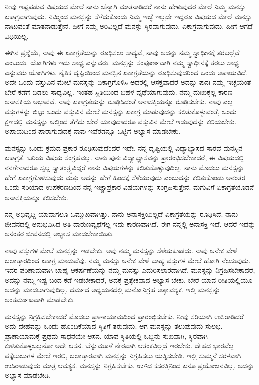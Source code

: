ನೀವು ಇಷ್ಟಪಡುವ ವಿಷಯದ ಮೇಲೆ ನಾನು ಚೆನ್ನಾಗಿ ಮಾತನಾಡಿದರೆ ನಾನು ಹೇಳುವುದರ ಮೇಲೆ ನಿಮ್ಮ ಮನಸ್ಸು ಏಕಾಗ್ರವಾಗುವುದು. ನಿಮ್ಮಿಂದ ಮನಸ್ಸನ್ನು ಸೆಳೆದುಕೊಂಡು ನಿಮ್ಮ ಇಚ್ಛೆ ಇಲ್ಲದೇ ಇದ್ದರೂ ವಿಷಯದ ಮೇಲೆ ಮನಸ್ಸು ನಾಟುವಂತೆ ಮಾತನಾಡುತ್ತೇನೆ. ಹೀಗೆ ನಮ್ಮ ಅರಿವಿಲ್ಲದೆ ಮನಸ್ಸು ಸ್ಥಿರವಾಗುವುದು, ಏಕಾಗ್ರವಾಗುವುದು. ಹೀಗೆ ಆಗದೆ ವಿಧಿಯಿಲ್ಲ.

ಈಗಿನ ಪ್ರಶ್ನೆಯೆ, ನಾವು ಈ ಏಕಾಗ್ರತೆಯನ್ನು ರೂಢಿಸಲು ಸಾಧ್ಯವೆ, ನಾವು ಅದನ್ನು ನಮ್ಮ ಸ್ವಾಧೀನಕ್ಕೆ ತರಬಲ್ಲೆವೆ ಎಂಬುದು. ಯೋಗಿಗಳು ಇದು ಸಾಧ್ಯ ಎನ್ನುವರು. ಮನಸ್ಸನ್ನು ಸಂಪೂರ್ಣವಾಗಿ ನಮ್ಮ ಸ್ವಾಧೀನಕ್ಕೆ ತರಲು ಸಾಧ್ಯ ಎನ್ನುವರು ಯೋಗಿಗಳು. ನೈತಿಕ ದೃಷ್ಟಿಯಿಂದ ಮನಸ್ಸಿನ ಏಕಾಗ್ರತೆಯನ್ನು ರೂಢಿಸುವುದರಿಂದ ಒಂದು ಅಪಾಯವಿದೆ. ಅದೇ ಒಂದು ವಸ್ತುವಿನ ಮೇಲೆ ಮನಸ್ಸನ್ನು ಏಕಾಗ್ರಗೊಳಿಸಿ ಅದರಲ್ಲಿ ಆಸಕ್ತವಾದರೆ ಅದನ್ನು ಪುನಃ ನಮ್ಮ ಇಚ್ಛೆಯಂತೆ ಬೇರೆ ಕಡೆಗೆ ಬಿಡಲು ಸಾಧ್ಯವಿಲ್ಲ. ಇಂತಹ ಸ್ಥಿತಿಯಿಂದ ಬಹಳ ವ್ಯಥೆಯಾಗುವುದು. ನಮ್ಮ ದುಃಖಕ್ಕೆಲ್ಲ ಕಾರಣ ಅನಾಸಕ್ತಿಯ ಅಭಾವವೆ. ನಾವು ಏಕಾಗ್ರತೆಯನ್ನು ರೂಢಿಸಿದಂತೆ ಅನಾಸಕ್ತಿಯನ್ನೂ ರೂಢಿಸಬೇಕು. ನಾವು ಎಲ್ಲ ವಸ್ತುಗಳನ್ನು ಬಿಟ್ಟು ಒಂದು ವಸ್ತುವಿನ ಮೇಲೆ ಮನಸ್ಸನ್ನು ಏಕಾಗ್ರ ಮಾಡುವುದನ್ನು ಕಲಿತುಕೊಳ್ಳುವಂತೆ, ಒಂದು ಕ್ಷಣದಲ್ಲಿ ಮನಸ್ಸನ್ನು ಅಲ್ಲಿಂದ ತೆಗೆದು ಬೇರೆ ಯಾವುದಾದರೂ ವಸ್ತುವಿನ ಮೇಲೆ ಇಡುವುದನ್ನು ಕಲಿಯಬೇಕು. ಅಪಾಯದಿಂದ ಪಾರಾಗುವುದಕ್ಕೆ ನಾವು ಇವೆರಡನ್ನೂ ಒಟ್ಟಿಗೆ ಅಭ್ಯಾಸ ಮಾಡಬೇಕು.

ಮನಸ್ಸನ್ನು ಒಂದು ಕ್ರಮದ ಪ್ರಕಾರ ರೂಢಿಸುವುದೆಂದರೆ ಇದೇ. ನನ್ನ ದೃಷ್ಟಿಯಲ್ಲಿ ವಿದ್ಯಾಭ್ಯಾಸದ ಸಾರವೆ ಮನಸ್ಸಿನ ಏಕಾಗ್ರತೆ. ಬರಿಯ ವಿಷಯ ಸಂಗ್ರಹವಲ್ಲ. ನಾನು ಪುನಃ ವಿದ್ಯಾಭ್ಯಾಸವನ್ನು ಪ್ರಾರಂಭಿಸಬೇಕಾದರೆ, ಈ ವಿಷಯದಲ್ಲಿ ನನಗೇನಾದರೂ ಸ್ವಲ್ಪ ಸ್ವಾತಂತ್ರ್ಯವಿದ್ದರೆ ನಾನು ವಿಷಯಗಳನ್ನು ಕಲಿತುಕೊಳ್ಳುವುದಿಲ್ಲ. ನಾನು ಮೊದಲು ಮನಸ್ಸನ್ನು ಹೇಗೆ ಏಕಾಗ್ರಗೊಳಿಸುವುದು ಮತ್ತು ಅದನ್ನು ಹೇಗೆ ಹಿಂದಕ್ಕೆ ಸೆಳೆಯುವುದು ಎಂಬುದನ್ನು ಕಲಿತುಕೊಂಡು ಅನಂತರ ಒಂದು ಸರಿಯಾದ ಉಪಕರಣದಿಂದ ನನ್ನ ಇಚ್ಚಾಪ್ರಕಾರ ವಿಷಯಗಳನ್ನು ಸಂಗ್ರಹಿಸುತ್ತೇನೆ. ಮಗುವಿಗೆ ಏಕಾಗ್ರತೆಯೊಡನೆ ಅನಾಸಕ್ತಿಯನ್ನೂ ಕಲಿಸಬೇಕು.

ನನ್ನ ಅಭಿವೃದ್ದಿ ಯಾವಾಗಲೂ ಒಮ್ಮುಖವಾಗಿತ್ತು. ನಾನು ಅನಾಸಕ್ತಿಯಿಲ್ಲದೆ ಏಕಾಗ್ರತೆಯನ್ನು ರೂಢಿಸಿದೆ. ನಾನು ಜೀವನದಲ್ಲಿ ಅನುಭವಿಸಿದ ಅತಿ ದಾರುಣ\break ವ್ಯಥೆಗೆಲ್ಲ ಇದು ಕಾರಣವಾಗಿದೆ. ಈಗ ನನ್ನಲ್ಲಿ ಅನಾಸಕ್ತಿ ಇದೆ. ಆದರೆ ಇದನ್ನು ಅನಂತರ ಜೀವನದಲ್ಲಿ ಅಭ್ಯಾಸ ಮಾಡಬೇಕಾಯಿತು.

ನಾವು ವಸ್ತುಗಳ ಮೇಲೆ ಮನಸ್ಸನ್ನು ಇಡಬೇಕು. ಅವು ನಮ್ಮ ಮನಸ್ಸನ್ನು ಸೆಳೆಯಕೂಡದು. ನಾವು ಅನೇಕ ವೇಳೆ ಬಲಾತ್ಕಾರದಿಂದ ಏಕಾಗ್ರ ಮಾಡುವೆವು. ನಮ್ಮ ಮನಸ್ಸು ಅನೇಕ ವೇಳೆ ಬಾಹ್ಯ ವಸ್ತುಗಳ ಮೇಲೆ ಹೋಗಿ ನೆಲಸುವುದು. ಇದರ ಪರಿಣಾಮವಾಗಿ ಬಾಹ್ಯ ಆಕರ್ಷಣೆಯನ್ನು ನಮ್ಮ ಮನಸ್ಸು ಎದುರಿಸಲಾರದಾಗಿದೆ. ಮನಸ್ಸನ್ನು ನಿಗ್ರಹಿಸಬೇಕಾದರೆ, ಅದನ್ನು ನಮ್ಮ ಇಷ್ಟ ಬಂದ ಕಡೆ ಇಡಬೇಕಾದರೆ, ಅದಕ್ಕೆ ಪ್ರತ್ಯೇಕವಾದ ಅಭ್ಯಾಸ ಬೇಕು. ಬೇರೆ ಯಾವ ರೀತಿಯಲ್ಲಿಯೂ ಅದನ್ನು ಮಾಡಲಾಗುವುದಿಲ್ಲ. ಧರ್ಮದ ಅಧ್ಯಯನದಲ್ಲಿ ಮನೋನಿಗ್ರಹ ಅತ್ಯಾವಶ್ಯಕ. ಇಲ್ಲಿ ಮನಸ್ಸನ್ನು ಅಂತರ್ಮುಖವಾಗಿ ಮಾಡಬೇಕು.

ಮನಸ್ಸನ್ನು ನಿಗ್ರಹಿಸಬೇಕಾದರೆ ಮೊದಲು ಪ್ರಾಣಾಯಾಮದಿಂದ ಪ್ರಾರಂಭಿಸಬೇಕು. ನೀವು ಸರಿಯಾಗಿ ಉಸಿರಾಡಿದರೆ ಅದು ದೇಹವನ್ನು ಒಂದು ಹೊಂದಿಕೆಯಾದ ಸ್ಥಿತಿಗೆ ತರುವುದು. ಆಗ ಮನಸ್ಸನ್ನು ತಲುಪುವುದು ಸುಲಭ. ಪ್ರಾಣಾಯಾಮಕ್ಕೆ ಪ್ರಥಮ ಸಾಧನೆಯೇ ಆಸನ. ಯಾವ ಸ್ಥಿತಿಯಲ್ಲಿ ಒಬ್ಬನು ಸುಖವಾಗಿ, ಸ್ಥಿರವಾಗಿ ಕುಳಿತುಕೊಳ್ಳಬಲ್ಲನೋ ಅದೇ ಆಸನ. ಬೆನ್ನುಮೂಳೆ ನೇರವಾಗಿ ಆತಂಕವಿಲ್ಲದೆ ಇರಬೇಕು. ದೇಹದ ಭಾರವೆಲ್ಲ ಪಕ್ಕೆಲುಬುಗಳ ಮೇಲೆ ಇರಲಿ, ಬಲಾತ್ಕಾರವಾಗಿ ಮನಸ್ಸನ್ನು ನಿಗ್ರಹಿಸಲು ಯತ್ನಿಸಬೇಡಿ. ಇಲ್ಲಿ ಸುಮ್ಮನೆ ಸರಳವಾಗಿ ಉಸಿರಾಡುವುದು ಮಾತ್ರ ಆವಶ್ಯಕ. ಮನಸ್ಸನ್ನು ನಿಗ್ರಹಿಸಬೇಕು. ಉಳಿದ ಕಸರತ್ತಿನಿಂದ ಏನೂ ಪ್ರಯೋಜನವಿಲ್ಲ. ಅದನ್ನು ಅಭ್ಯಾಸ ಮಾಡಬೇಡಿ.

